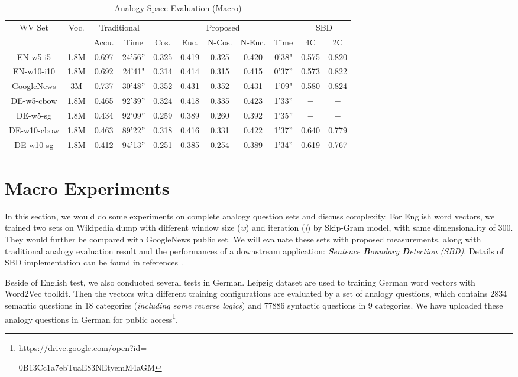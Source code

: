 \documentclass[11pt,letterpaper]{article}
\begin{document}
\begin{table*}
\centering
\caption{Analogy Space Evaluation (Macro)}
\begin{tabular}{c | c | c c | c c c c c | c c}
\hline
\multicolumn{1}{c|}{\multirow{2}{*}{WV Set}} & \multicolumn{1}{c|}{\multirow{2}{*}{Voc.}} & \multicolumn{2}{c|}{Traditional} & \multicolumn{5}{c|}{Proposed} & \multicolumn{2}{c}{SBD}\\
\cline{3-11}
& & Accu. & Time & Cos. & Euc. & N-Cos. & N-Euc. & Time & 4C & 2C\\
\hline
EN-w5-i5 & 1.8M & 0.697 & 24'56'' & 0.325 & 0.419 & 0.325 & 0.420 & 0'38" &  0.575 & 0.820\\
EN-w10-i10 & 1.8M & 0.692 & 24'41" & 0.314 & 0.414 & 0.315 & 0.415 & 0'37'' &  0.573 & 0.822\\
GoogleNews & 3M & 0.737 & 30'48'' & 0.352 & 0.431 & 0.352 & 0.431 & 1'09" & 0.580 & 0.824\\
\hline
DE-w5-cbow & 1.8M  & 0.465 & 92'39'' & 0.324 & 0.418 & 0.335 & 0.423 & 1'33'' & $-$ & $-$\\
DE-w5-sg & 1.8M  & 0.434 & 92'09'' & 0.259 & 0.389 & 0.260 & 0.392 & 1'35'' & $-$ & $-$\\
DE-w10-cbow & 1.8M  & 0.463 & 89'22'' & 0.318 & 0.416 & 0.331 & 0.422 & 1'37'' & 0.640 & 0.779\\
DE-w10-sg & 1.8M  & 0.412 & 94'13'' & 0.251 & 0.385 & 0.254 & 0.389 & 1'34'' & 0.619 & 0.767\\
\hline
\end{tabular}
\end{table*}


\section{Macro Experiments}

In this section, we would do some experiments on complete analogy question sets and discuss complexity. For English word vectors, we trained two sets on Wikipedia dump with different window size (\textit{w}) and iteration (\textit{i}) by Skip-Gram model, with same dimensionality of 300. They would further be compared with GoogleNews public set. We will evaluate these sets with proposed measurements, along with traditional analogy evaluation result and the performances of a downstream application: \textit{\textbf{S}entence \textbf{B}oundary \textbf{D}etection (SBD)}. Details of SBD implementation can be found in references \cite{che2016sentence,che2016punctuation}.

Beside of English test, we also conducted several tests in German. Leipzig dataset \cite{goldhahn2012building} are used to training German word vectors with Word2Vec toolkit. Then the vectors with different training configurations are evaluated by a set of analogy questions, which contains 2834 semantic questions in 18 categories (\textit{including some reverse logics}) and 77886 syntactic questions in 9 categories. We have uploaded these analogy questions in German for public access\footnote{https://drive.google.com/open?id=

0B13Cc1a7ebTuaE83NEtyemM4aGM}.
\end{document}
